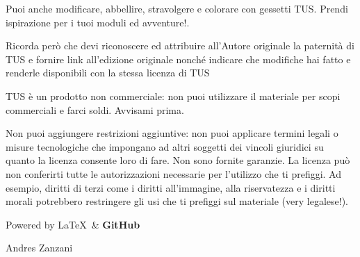 \documentclass[a4paper,11pt,twoside,openany]{book}
\begin{document}
Puoi anche modificare, abbellire, stravolgere e colorare con gessetti TUS. Prendi ispirazione per i tuoi moduli ed avventure!.

Ricorda però che devi riconoscere ed attribuire all'Autore originale la paternità di TUS e fornire link all'edizione originale nonché indicare che modifiche hai fatto e renderle disponibili con la stessa licenza di TUS

\bigskip
TUS è un prodotto non commerciale: non puoi utilizzare il materiale per scopi commerciali e farci soldi. Avvisami prima.

\bigskip
Non puoi aggiungere restrizioni aggiuntive: non puoi applicare termini legali o misure tecnologiche che impongano ad altri soggetti dei vincoli giuridici su quanto la licenza consente loro di fare. Non sono fornite garanzie. La licenza può non conferirti tutte le autorizzazioni necessarie per l'utilizzo che ti prefiggi. Ad esempio, diritti di terzi come i diritti all'immagine, alla riservatezza e i diritti morali potrebbero restringere gli usi che ti prefiggi sul materiale (very legalese!).

\bigskip

Powered by \Large\LaTeX\ \normalfont\& \Large\textbf{GitHub}

\bigskip

Andres Zanzani


\normalsize

\pagebreak
\end{document}
